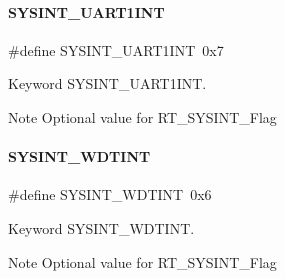 \paragraph{\texorpdfstring{S\+Y\+S\+I\+N\+T\+\_\+\+U\+A\+R\+T1\+I\+NT}{SYSINT\_UART1INT}}
{\footnotesize\ttfamily \#define S\+Y\+S\+I\+N\+T\+\_\+\+U\+A\+R\+T1\+I\+NT~0x7}



Keyword S\+Y\+S\+I\+N\+T\+\_\+\+U\+A\+R\+T1\+I\+NT. 

\begin{DoxyNote}{Note}
Optional value for R\+T\+\_\+\+S\+Y\+S\+I\+N\+T\+\_\+\+Flag 
\end{DoxyNote}
\mbox{\label{a00011_af64d968502ca7ba62141dd55f5647730}} 
\paragraph{\texorpdfstring{S\+Y\+S\+I\+N\+T\+\_\+\+W\+D\+T\+I\+NT}{SYSINT\_WDTINT}}
{\footnotesize\ttfamily \#define S\+Y\+S\+I\+N\+T\+\_\+\+W\+D\+T\+I\+NT~0x6}



Keyword S\+Y\+S\+I\+N\+T\+\_\+\+W\+D\+T\+I\+NT. 

\begin{DoxyNote}{Note}
Optional value for R\+T\+\_\+\+S\+Y\+S\+I\+N\+T\+\_\+\+Flag 
\end{DoxyNote}
